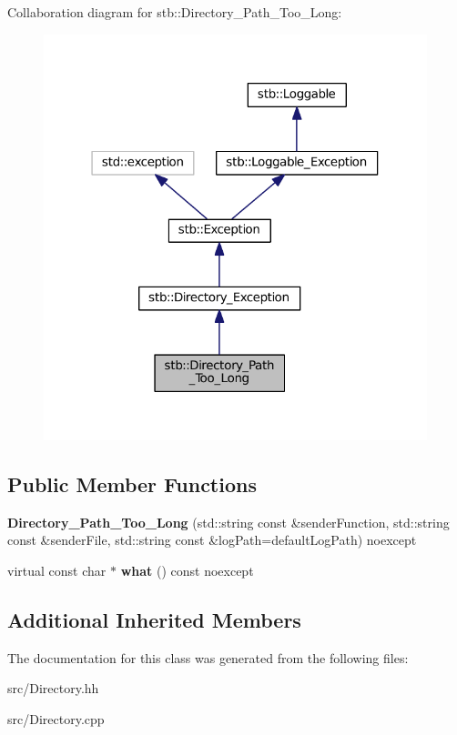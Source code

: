 Collaboration diagram for stb\+:\+:Directory\+\_\+\+Path\+\_\+\+Too\+\_\+\+Long\+:
\nopagebreak
\begin{figure}[H]
\begin{center}
\leavevmode
\includegraphics[width=316pt]{classstb_1_1Directory__Path__Too__Long__coll__graph}
\end{center}
\end{figure}
\subsection*{Public Member Functions}
\begin{DoxyCompactItemize}
\item 
\hypertarget{classstb_1_1Directory__Path__Too__Long_a7dc13d0a19b357b2b8f4fc566327d4ab}{{\bfseries Directory\+\_\+\+Path\+\_\+\+Too\+\_\+\+Long} (std\+::string const \&sender\+Function, std\+::string const \&sender\+File, std\+::string const \&log\+Path=default\+Log\+Path) noexcept}\label{classstb_1_1Directory__Path__Too__Long_a7dc13d0a19b357b2b8f4fc566327d4ab}

\item 
\hypertarget{classstb_1_1Directory__Path__Too__Long_aa1d42928e0d5d30437381df202c3d52a}{virtual const char $\ast$ {\bfseries what} () const noexcept}\label{classstb_1_1Directory__Path__Too__Long_aa1d42928e0d5d30437381df202c3d52a}

\end{DoxyCompactItemize}
\subsection*{Additional Inherited Members}


The documentation for this class was generated from the following files\+:\begin{DoxyCompactItemize}
\item 
src/Directory.\+hh\item 
src/Directory.\+cpp\end{DoxyCompactItemize}
